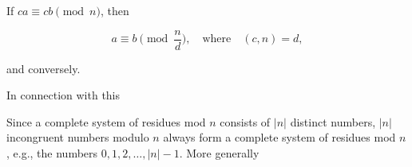 If $ca \equiv cb \pmod{n}$, then

$$a \equiv b \pmod{\frac{n}{d}}, \quad \text{where} \quad (c, n) = d,$$

and conversely.

In connection with this

Since a complete system of residues mod $n$ consists of $|n|$ distinct numbers, $|n|$ incongruent numbers modulo $n$ always form a complete system of residues mod $n$, e.g., the numbers $0, 1, 2, \ldots, |n| - 1$. More generally
